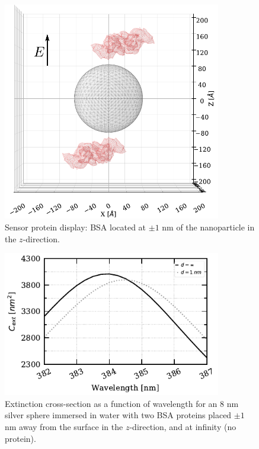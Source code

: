 \begin{center}
    \begin{figure} %
       \centering
       \includegraphics[width=0.85\textwidth]{2prot_1nm_z_R8nm.pdf} 
       \caption{Sensor protein display: BSA located at $\pm 1$ nm of the 
                nanoparticle in the $z$-direction.}
       \label{fig:display_z}
    \end{figure}
    \end{center}

\begin{figure} %
    \centering
    \includegraphics[width=0.85\textwidth]{2pz_R8nm.pdf} 
    \caption{Extinction cross-section as a function of wavelength for an $8$ nm
             silver sphere immersed in water with two BSA proteins placed 
             $\pm 1$ nm away from the surface in the $z$-direction, and at
             infinity (no protein).}
    \label{fig:2pz_response}
 \end{figure}

